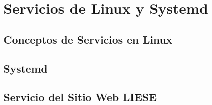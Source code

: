 \chapter{Servicios de Linux y Systemd}
\section{Conceptos de Servicios en Linux}
\section{Systemd}
\section{Servicio del Sitio Web LIESE}
